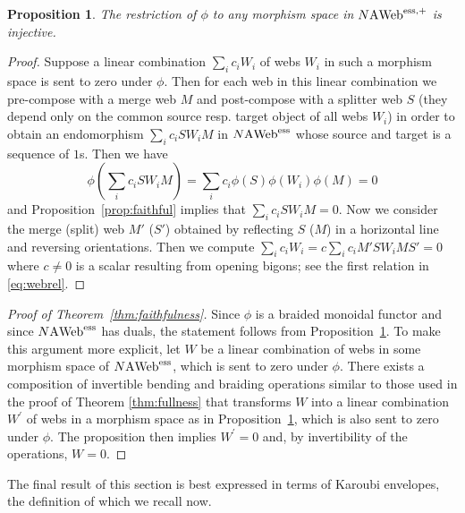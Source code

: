 \documentclass[11pt]{article}
\newtheorem{prop}[theo]{Proposition}
\theoremstyle{definition}
\numberwithin{equation}{section}
\newcommand{\cat}[1]{\ensuremath{\mbox{\bfseries {\upshape {#1}}}}}
\newcommand{\AWeb}[1][]{#1\cat{A}\cat{Web}}
\newcommand{\essAWeb}[1][]{#1\AWeb^{\mathrm{ess}}}
\newcommand{\essAWebp}[1][]{#1\AWeb^{\mathrm{ess},+}}
\begin{document}
\begin{prop}\label{prop:faithful2} The restriction of $\phi$ to any morphism space in $\essAWebp[N]$ is injective.
\end{prop}
\begin{proof}
Suppose a linear combination $\sum_i c_i W_i$ of webs $W_i$ in such a morphism
space is sent to zero under $\phi$. Then for each web in this linear
combination we pre-compose with a merge web $M$ and post-compose with a splitter
web $S$ (they depend only on the common source resp. target object of all webs
$W_i$) in order to obtain an endomorphism $\sum_i c_i S W_i M$ in $\essAWeb[N]$
whose source and target is a sequence of $1$s. Then we have $$\phi(\sum_i c_i S
W_i M)= \sum_i c_i \phi(S)\phi(W_i)\phi(M)=0$$ and
Proposition~\ref{prop:faithful} implies that $\sum_i c_i S W_i M=0$. Now we
consider the merge (split) web $M'$ ($S'$) obtained by reflecting $S$ ($M$) in a
horizontal line and reversing orientations. Then we compute $\sum_i c_i W_i= c
\sum_i c_i M' S W_i M S' = 0$ where $c\neq 0$ is a scalar resulting from opening
bigons; see the first relation in \eqref{eq:webrel}. 
\end{proof}

\begin{proof}[Proof of Theorem~\ref{thm:faithfulness}]
Since $\phi$ is a braided monoidal functor and since $\essAWeb[N]$ has duals,
the statement follows from Proposition~\ref{prop:faithful2}. To make this
argument more explicit, let $W$ be a linear combination of webs in some morphism
space of $\essAWeb[N]$, which is sent to zero under $\phi$. There exists a
composition of invertible bending and braiding operations similar to those used
in the proof of Theorem \ref{thm:fullness} that transforms $W$ into a linear
combination $W^\prime$ of webs in a morphism space as in
Proposition~\ref{prop:faithful2}, which is also sent to zero under $\phi$. The
proposition then implies $W^\prime=0$ and, by invertibility of the operations,
$W=0$.
\end{proof}


The final result of this section is best expressed in terms of Karoubi
envelopes, the definition of which we recall now.
\end{document}
